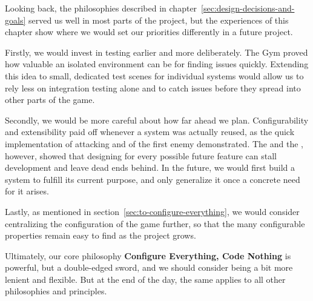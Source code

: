 \documentclass[../Main.tex]{subfiles}
\begin{document}
Looking back, the philosophies described in chapter~\ref{sec:design-decisions-and-goals} served us well in most parts of the project, but the experiences of this chapter show where we would set our priorities differently in a future project.

Firstly, we would invest in testing earlier and more deliberately. The Gym proved how valuable an isolated environment can be for finding issues quickly. Extending this idea to small, dedicated test scenes for individual systems would allow us to rely less on integration testing alone and to catch issues before they spread into other parts of the game.

Secondly, we would be more careful about how far ahead we plan. Configurability and extensibility paid off whenever a system was actually reused, as the quick implementation of attacking and of the first enemy demonstrated. The  and the , however, showed that designing for every possible future feature can stall development and leave dead ends behind. In the future, we would first build a system to fulfill its current purpose, and only generalize it once a concrete need for it arises.

Lastly, as mentioned in section~\ref{sec:to-configure-everything}, we would consider centralizing the configuration of the game further, so that the many configurable properties remain easy to find as the project grows. 

Ultimately, our core philosophy \textbf{Configure Everything, Code Nothing} is powerful, but a double-edged sword, and we should consider being a bit more lenient and flexible. But at the end of the day, the same applies to all other philosophies and principles.

\newpage
\end{document}
